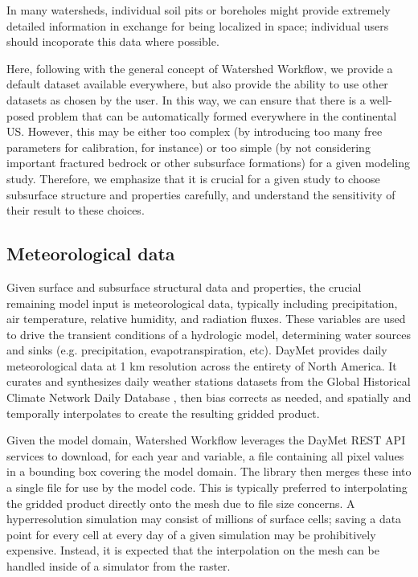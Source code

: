 \documentclass[a4paper,fleqn]{cas-dc}
\newcommand{\note}[1]{\emph{\color{red}{#1}}}
\begin{document}
In many watersheds, individual soil pits or boreholes might provide extremely detailed information in exchange for being localized in space; individual users should incoporate this data where possible.

Here, following with the general concept of Watershed Workflow, we provide a default dataset available everywhere, but also provide the ability to use other datasets as chosen by the user.
\note{Can we provide a single default?  A composite default?  Or is user intervention required here?}
In this way, we can ensure that there is a well-posed problem that can be automatically formed everywhere in the continental US.
However, this may be either too complex (by introducing too many free parameters for calibration, for instance) or too simple (by not considering important fractured bedrock or other subsurface formations) for a given modeling study.
Therefore, we emphasize that it is crucial for a given study to choose subsurface structure and properties carefully, and understand the sensitivity of their result to these choices.

\subsection{Meteorological data}\label{ssc:acquisition:met}
%
Given surface and subsurface structural data and properties, the crucial remaining model input is meteorological data, typically including precipitation, air temperature, relative humidity, and radiation fluxes.
These variables are used to drive the transient conditions of a hydrologic model, determining water sources and sinks (e.g. precipitation, evapotranspiration, etc).
DayMet\cite{} provides daily meteorological data at 1 km resolution across the entirety of North America.
It curates and synthesizes daily weather stations datasets from the Global Historical Climate Network Daily Database \cite{}, then bias corrects as needed, and spatially and temporally interpolates to create the resulting gridded product.

Given the model domain, Watershed Workflow leverages the DayMet REST API services to download, for each year and variable, a file containing all pixel values in a bounding box covering the model domain.
The library then merges these into a single file for use by the model code.
This is typically preferred to interpolating the gridded product directly onto the mesh due to file size concerns.
A hyperresolution simulation may consist of millions of surface cells; saving a data point for every cell at every day of a given simulation may be prohibitively expensive.
Instead, it is expected that the interpolation on the mesh can be handled inside of a simulator from the raster.
\end{document}
